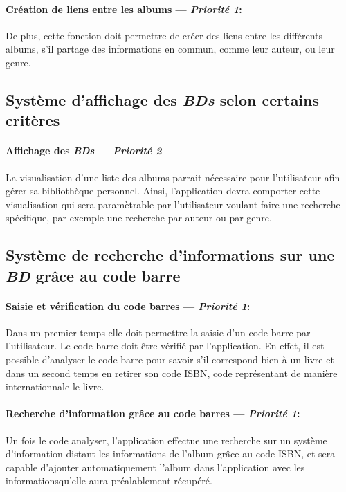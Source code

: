 \paragraph{Création de liens entre les albums ---  \textit{Priorité 1}:}  
De plus, cette fonction doit permettre de créer des liens entre les différents albums, s'il partage des informations en commun, comme leur auteur, ou leur genre.

\subsection{Système d'affichage des \emph{BDs} selon certains critères}
\paragraph{Affichage des \emph{BDs} ---  \textit{Priorité 2}}

La visualisation d'une liste des albums parrait nécessaire pour l'utilisateur afin gérer sa bibliothèque personnel. Ainsi, l'application devra comporter cette visualisation qui sera paramètrable par l'utilisateur voulant faire une recherche spécifique, par exemple une recherche par auteur ou par genre.

\subsection{Système de recherche d'informations sur une \emph{BD}  grâce au code barre}

\paragraph{Saisie et vérification du code barres ---  \textit{Priorité 1}:}
Dans un premier temps elle doit permettre la saisie d'un code barre par l'utilisateur. Le code barre doit être vérifié par l'application. En effet, il est possible d'analyser le code barre pour savoir s'il correspond bien à un livre et dans un second temps en retirer son code ISBN, code représentant de manière internationnale le livre.
\paragraph{Recherche d'information grâce au code barres ---  \textit{Priorité 1}:}  
Un fois le code analyser, l'application effectue une recherche sur un système d'information distant les informations de l'album grâce au code ISBN, et sera capable d'ajouter automatiquement l'album dans l'application avec les informationsqu'elle aura préalablement récupéré.
